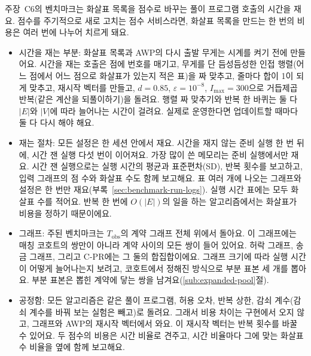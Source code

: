 
주장~C6의 벤치마크는 화살표 목록을 점수로 바꾸는 풀이 프로그램 호출의 시간을 재요. 점수를 주기적으로 새로 고치는 점수 서비스라면, 화살표 목록을 만드는 한 번의 비용은 여러 번에 나누어 치르게 돼요.

\begin{itemize}
\item 시간을 재는 부분: 화살표 목록과 AWP의 다시 출발 무게는 시계를 켜기 전에 만들어요. 시간을 재는 호출은 점에 번호를 매기고, 무게를 단 듬성듬성한 인접 행렬(어느 점에서 어느 점으로 화살표가 있는지 적은 표)을 짜 맞추고, 줄마다 합이 1이 되게 맞추고, 재시작 벡터를 만들고, $d=0.85$, $\varepsilon=10^{-8}$, $I_{\max}=300$으로 거듭제곱 반복(같은 계산을 되풀이하기)을 돌려요. 행렬 짜 맞추기와 반복 한 바퀴는 둘 다 $|E|$와 $|V|$에 따라 늘어나는 시간이 걸려요. 실제로 운영한다면 업데이트할 때마다 둘 다 다시 해야 해요.

\item 재는 절차: 모든 설정은 한 세션 안에서 재요. 시간을 재지 않는 준비 실행 한 번 뒤에, 시간 잰 실행 다섯 번이 이어져요. 가장 많이 쓴 메모리는 준비 실행에서만 재요. 시간 잰 실행으로는 실행 시간의 평균과 표준편차(SD), 반복 횟수를 보고하고, 입력 그래프의 점 수와 화살표 수도 함께 보고해요. 표 여러 개에 나오는 그래프와 설정은 한 번만 재요(부록~\ref{sec:benchmark-run-logs}). 실행 시간 표에는 모두 화살표 수를 적어요. 반복 한 번에 $O(|E|)$의 일을 하는 알고리즘에서는 화살표가 비용을 정하기 때문이에요\parencite{langville2006pagerank}.

\item 그래프: 주된 벤치마크는 $T_{\mathrm{obs}}$의 계약 그래프 전체 위에서 돌아요. 이 그래프에는 매칭 코호트의 쌍만이 아니라 계약 사이의 모든 쌍이 들어 있어요. 허락 그래프, 송금 그래프, 그리고 \mbox{C-PR}에는 그 둘의 합집합이에요. 그래프 크기에 따라 실행 시간이 어떻게 늘어나는지 보려고, 코호트에서 정해진 방식으로 부분 표본 세 개를 뽑아요. 부분 표본은 뽑힌 계약에 닿는 쌍을 남겨요(\ref{sub:expanded-pool}절).

\item 공정함: 모든 알고리즘은 같은 풀이 프로그램, 허용 오차, 반복 상한, 감쇠 계수(감쇠 계수를 바꿔 보는 실험은 빼고)로 돌려요. 그래서 비용 차이는 구현에서 오지 않고, 그래프와 AWP의 재시작 벡터에서 와요. 이 재시작 벡터는 반복 횟수를 바꿀 수 있어요. 두 점수의 비용은 시간 비율로 견주고, 시간 비율마다 그에 맞는 화살표 수 비율을 옆에 함께 보고해요.

\end{itemize}

